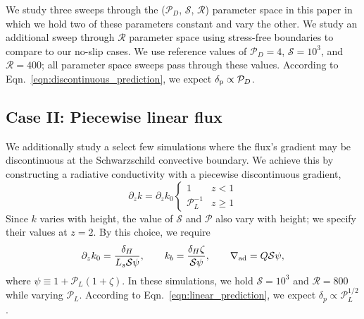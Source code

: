 \documentclass[twocolumn]{aastex631}
\newcommand{\gradad}{\ensuremath{\nabla_{\rm{ad}}}}
\newcommand{\delp}{\ensuremath{\delta_{\rm{p}}}}
\newcommand{\mP}{\ensuremath{\mathcal{P}}}
\newcommand{\mR}{\ensuremath{\mathcal{R}}}
\newcommand{\mS}{\ensuremath{\mathcal{S}}}
\begin{document}
We study three sweeps through the ($\mP_D$, $\mS$, $\mR$) parameter space in this paper in which we hold two of these parameters constant and vary the other.
We study an additional sweep through $\mR$ parameter space using stress-free boundaries to compare to our no-slip cases.
We use reference values of $\mP_D = 4$, $\mS = 10^3$, and $\mR = 400$; all parameter space sweeps pass through these values.
According to Eqn.~\ref{eqn:discontinuous_prediction}, we expect $\delp \propto \mP_D$.

\subsection{Case II: Piecewise linear flux}
We additionally study a select few simulations where the flux's gradient may be discontinuous at the Schwarzschild convective boundary.
We achieve this by constructing a radiative conductivity with a piecewise discontinuous gradient,
\begin{equation}
\partial_z k = \partial_z k_0
\begin{cases}
1	&	z < 1 \\
\mP_L^{-1} &	z \geq 1
\end{cases}
\label{eqn:sim_linear_k}
\end{equation}
Since $k$ varies with height, the value of $\mS$ and $\mP$ also vary with height; we specify their values at $z = 2$.
By this choice, we require
\begin{equation}
\partial_z k_0 = \frac{\delta_H}{L_s \mS \psi},\qquad
k_b = \frac{\delta_H\zeta}{\mS\psi},\qquad
\gradad = Q \mS \psi,
\end{equation}
where $\psi \equiv 1 + \mP_L(1 + \zeta)$.
In these simulations, we hold $\mS = 10^3$ and $\mR = 800$ while varying $\mP_L$.
According to Eqn.~\ref{eqn:linear_prediction}, we expect $\delta_p \propto \mP_L^{1/2}$.
\end{document}
